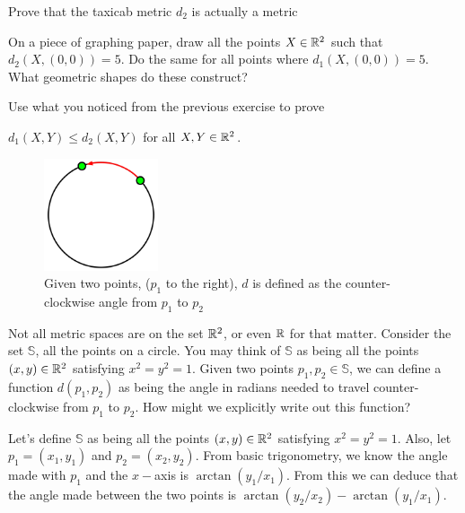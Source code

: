 \begin{exercise}
    Prove that the taxicab metric $d_2$ is actually a metric
\end{exercise}
\vspace{-3mm}

\begin{exercise}
    On a piece of graphing paper, draw all the points $X\in\mathbb{R}^2$ such that $d_{\text{2}}(X,(0,0))=5$. Do the same for all points where $d_{\text{1}}(X,(0,0))=5$. What geometric shapes do these construct?
\end{exercise}

\begin{exercise}
    Use what you noticed from the previous exercise to prove \par
    $d_{\text{1}}(X,Y)\leq d_{\text{2}}(X,Y)$ for all $X,Y\in\mathbb{R}^2$.
\end{exercise}

\begin{figure}
  \begin{center}
      \vspace{-\intextsep-5mm}

    \includegraphics[width=0.3\textwidth]{Images/Chap0/Circle Metric.png}
  \end{center}
  \caption{Given two points, ($p_1$ to the right), $d$ is defined as the counter-clockwise angle from $p_1$ to $p_2$}
\end{figure}

Not all metric spaces are on the set $\mathbb{R}^2$, or even $\mathbb{R}$ for that matter. Consider the set $\mathbb{S}$, all the points on a circle. You may think of $\mathbb{S}$ as being all the points $(x,y)\in\mathbb{R}^2$ satisfying $x^2=y^2=1$. Given two points $p_1,p_2\in\mathbb{S}$, we can define a function $d(p_1,p_2)$ as being the angle in radians needed to travel counter-clockwise from $p_1$ to $p_2$. How might we explicitly write out this function?\par

Let's define $\mathbb{S}$ as being all the points $(x,y)\in\mathbb{R}^2$ satisfying $x^2=y^2=1$. Also, let $p_1=(x_1,y_1)$ and $p_2=(x_2,y_2)$. From basic trigonometry, we know the angle made with $p_1$ and the $x-$axis is $\arctan(y_1/x_1)$. From this we can deduce that the angle made between the two points is $\arctan(y_2/x_2)-\arctan(y_1/x_1)$. 


